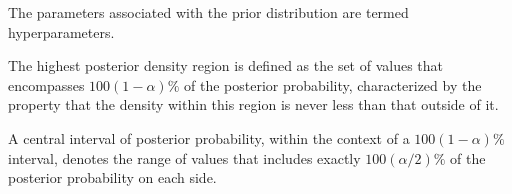 \begin{theorem}\label{eq:Bayesian}
\end{theorem}

\begin{definition}
	The parameters associated with the prior distribution are termed hyperparameters.
\end{definition}
\begin{definition}
	The highest posterior density region is defined as the set of values that encompasses $100(1-\alpha)\%$ of the posterior probability, characterized by the property that the density within this region is never less than that outside of it. \par
	A central interval of posterior probability, within the context of a $100(1 - \alpha)\%$ interval, denotes the range of values that includes exactly $100(\alpha/2)\%$ of the posterior probability on each side.
\end{definition}

